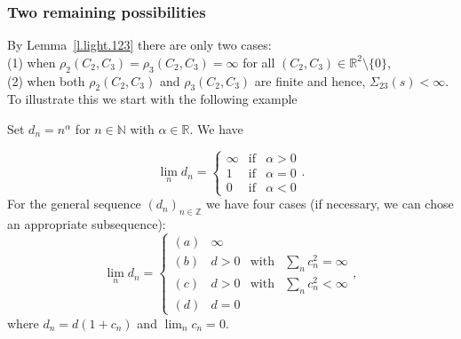 \documentclass[preprint,12pt]{elsarticle}
\numberwithin{equation}{section}
\begin{document}
\subsubsection{Two remaining possibilities}
\label{ss.2-cases}
%
By Lemma~\ref{l.light.123}  there are only two cases:\\
(1) when $\rho_2(C_2,C_3)=\rho_3(C_2,C_3)=\infty$ for all $(C_2,C_3)\in \mathbb R^2\setminus\{0\}$,\\
(2) when both $\rho_2(C_2,C_3)$ and $\rho_3(C_2,C_3)$ are finite and hence, $\Sigma_{23}(s)<\infty$.
%
To illustrate this we start with the following example
\begin{ex}
 \label{ex.(011)(a)}
Set $d_n=n^\alpha$ for $n\in \mathbb N$ with $\alpha\in \mathbb R$. We have 
\end{ex}
\begin{equation}
\label{d_n-ex}
\lim_nd_n=\!\left\{\begin{array}{rcc}
 \infty&\text{if}&\alpha>0\\
 1&\text{if}&\alpha=0\\
 0&\text{if}&\alpha<0
\end{array}\right.. 
\end{equation}
%
For the general sequence $(d_n)_{n\in \mathbb Z}$ 
we have four cases (if necessary, we can chose an appropriate subsequence):
%
\begin{equation}
\label{d_n-gen}
\lim_nd_n=\!\left\{\begin{array}{clcc}
(a)& \infty&&\\
(b)&d>0&\text{with}&\sum_nc_n^2=\infty\\
(c)&d>0&\text{with}&\sum_nc_n^2<\infty\\
(d)&d=0&
\end{array}\right., 
\end{equation}
where $d_n=d(1+c_n)$ and $\lim_nc_n=0$.
\end{document}
